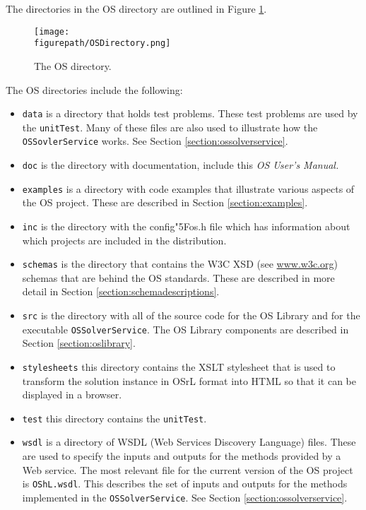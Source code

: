 \documentclass[11pt]{article}
\newcommand{\figurepath}{./figures}
\newcounter{Fig}
\renewcommand{\_}{{\char"5F}}
\renewcommand{\{}{{\char"7B}}
\renewcommand{\}}{{\char"7D}}
\renewcommand{\^}{{\char"0D}}
\renewcommand{\'}{{\char"0D}}
\begin{document}
The directories in the OS directory are outlined in Figure \ref{figure:osdirectory}.


\begin{figure}
\centering
\texttt{[image: \\figurepath/OSDirectory.png]}
\caption{The OS directory.} 
\label{figure:osdirectory}
\end{figure}

The OS directories include the following:

\begin{itemize}

\item {\tt data} is a directory that holds test problems. These test problems are used by the {\tt unitTest}. Many of these files are also used to illustrate how the {\tt OSSovlerService} works. See Section \ref{section:ossolverservice}.

\item {\tt doc} is the directory with documentation, include this {\it OS User's Manual.}

\item {\tt examples} is a directory with code examples that illustrate various aspects of the OS project.    These are described in Section \ref{section:examples}.

\item {\tt inc} is the directory with the config\_os.h file which has information about which projects are included in the distribution.

\item {\tt schemas} is the directory that contains the W3C XSD (see \url{www.w3c.org}) schemas that are behind the OS standards. These are described in more detail in Section \ref{section:schemadescriptions}.

\item {\tt src} is the directory with all of the source code for the OS Library and for the executable {\tt OSSolverService}. The OS Library components are described in Section \ref{section:oslibrary}.

\item {\tt stylesheets} this directory contains the XSLT stylesheet that is used to transform the solution instance in OSrL format into HTML so that it can be displayed in a browser.

\item {\tt test} this directory contains the {\tt unitTest}.


\item  {\tt wsdl} is a directory of WSDL (Web Services Discovery Language) files. These are used to specify the inputs and outputs for the methods provided by a Web service. The most relevant file for the current version of the OS project is {\tt OShL.wsdl}.  This describes the set of inputs and outputs for the methods implemented in the {\tt OSSolverService}. See Section \ref{section:ossolverservice}.
\end{itemize}
\end{document}
